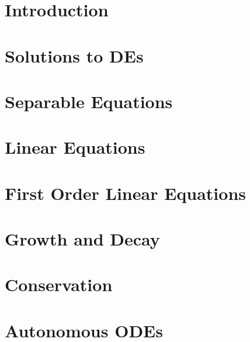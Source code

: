 \documentclass{beamer}
\begin{document}
\part{Introduction}



\part{Solutions to DEs}



\part{Separable Equations}






\part{Linear Equations}



\part{First Order Linear Equations}



\part{Growth and Decay}





\part{Conservation}



\part{Autonomous ODEs}





\end{document}
